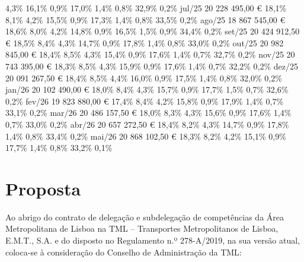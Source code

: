 \documentclass[
  a4paper,
]{article}
\begin{document}
4,3\% 16,1\% 0,9\% 17,0\% 1,4\% 0,8\% 32,9\% 0,2\% jul/25 20 228 495,00
€ 18,1\% 8,1\% 4,2\% 15,5\% 0,9\% 17,3\% 1,4\% 0,8\% 33,5\% 0,2\% ago/25
18 867 545,00 € 18,6\% 8,0\% 4,2\% 14,8\% 0,9\% 16,5\% 1,5\% 0,9\%
34,4\% 0,2\% set/25 20 424 912,50 € 18,5\% 8,4\% 4,3\% 14,7\% 0,9\%
17,8\% 1,4\% 0,8\% 33,0\% 0,2\% out/25 20 982 845,00 € 18,4\% 8,5\%
4,3\% 15,4\% 0,9\% 17,6\% 1,4\% 0,7\% 32,7\% 0,2\% nov/25 20 743 395,00
€ 18,3\% 8,5\% 4,3\% 15,9\% 0,9\% 17,6\% 1,4\% 0,7\% 32,2\% 0,2\% dez/25
20 091 267,50 € 18,4\% 8,5\% 4,4\% 16,0\% 0,9\% 17,5\% 1,4\% 0,8\%
32,0\% 0,2\% jan/26 20 102 490,00 € 18,0\% 8,4\% 4,3\% 15,7\% 0,9\%
17,7\% 1,5\% 0,7\% 32,6\% 0,2\% fev/26 19 823 880,00 € 17,4\% 8,4\%
4,2\% 15,8\% 0,9\% 17,9\% 1,4\% 0,7\% 33,1\% 0,2\% mar/26 20 486 157,50
€ 18,0\% 8,3\% 4,3\% 15,6\% 0,9\% 17,6\% 1,4\% 0,7\% 33,0\% 0,2\% abr/26
20 657 272,50 € 18,4\% 8,2\% 4,3\% 14,7\% 0,9\% 17,8\% 1,4\% 0,8\%
33,4\% 0,2\% mai/26 20 868 102,50 € 18,3\% 8,2\% 4,2\% 15,1\% 0,9\%
17,7\% 1,4\% 0,8\% 33,2\% 0,1\%

\section{Proposta}\label{proposta}

Ao abrigo do contrato de delegação e subdelegação de competências da
Área Metropolitana de Lisboa na TML -- Transportes Metropolitanos de
Lisboa, E.M.T., S.A. e do disposto no Regulamento n.º 278-A/2019, na sua
versão atual, coloca-se à consideração do Conselho de Administração da
TML:
\end{document}

